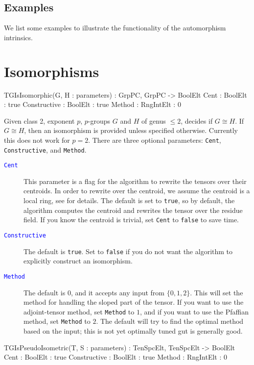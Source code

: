 \documentclass{documentation}
\begin{document}
\section{Examples}
We list some examples to illustrate the functionality of the automorphism intrinsics.

\chapter{Isomorphisms}

\begin{intrinsics}
TGIsIsomorphic(G, H : parameters) : GrpPC, GrpPC -> BoolElt
    Cent : BoolElt : true
    Constructive : BoolElt : true
    Method : RngIntElt : 0
\end{intrinsics}

Given class 2, exponent $p$, $p$-groups $G$ and $H$ of genus $\leq 2$, decides if $G\cong H$.
If $G\cong H$, then an isomorphism is provided unless specified otherwise.
Currently this does not work for $p=2$.  
There are three optional parameters: {\tt Cent}, {\tt Constructive}, and {\tt Method}.

\begin{description}
\item[\textcolor{blue}{\tt Cent}]
This parameter is a flag for the algorithm to rewrite the tensors over their centroids. 
In order to rewrite over the centroid, we assume the centroid is a local ring, see \cite{TensorSpacePackage} for details.
The default is set to {\tt true}, so by default, the algorithm computes the centroid and rewrites the tensor over the residue field.
If you know the centroid is trivial, set {\tt Cent} to {\tt false} to save time.
\item[\textcolor{blue}{\tt Constructive}]
The default is {\tt true}. 
Set to {\tt false} if you do not want the algorithm to explicitly construct an isomorphism.
\item[\textcolor{blue}{\tt Method}]
The default is $0$, and it accepts any input from $\{ 0,1,2\}$. 
This will set the method for handling the sloped part of the tensor.
If you want to use the adjoint-tensor method, set {\tt Method} to $1$, and if you want to use the Pfaffian method, set {\tt Method} to $2$. The default will try to find the optimal method based on the input; this is not yet optimally tuned gut is generally good.
\end{description}

\begin{intrinsics}
TGIsPseudoIsometric(T, S : parameters) : TenSpcElt, TenSpcElt -> BoolElt
    Cent : BoolElt : true
    Constructive : BoolElt : true
    Method : RngIntElt : 0
\end{intrinsics}
\end{document}
